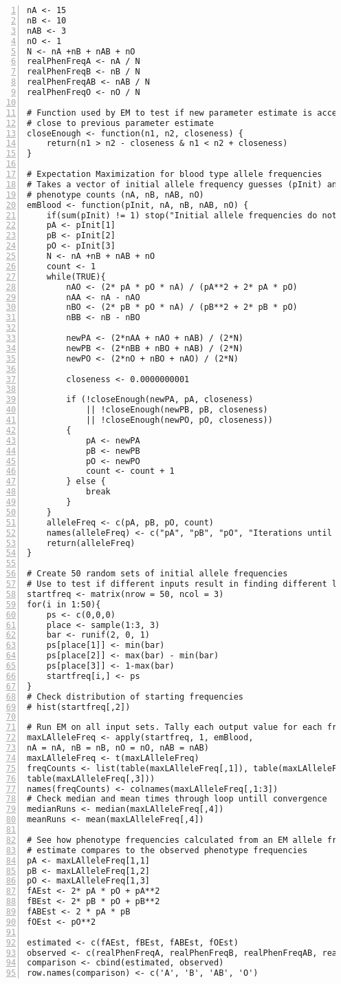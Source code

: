 \documentclass{article}
\begin{document}
		\begin{Verbatim}[numbers=left]
nA <- 15
nB <- 10
nAB <- 3
nO <- 1 
N <- nA +nB + nAB + nO
realPhenFreqA <- nA / N 
realPhenFreqB <- nB / N
realPhenFreqAB <- nAB / N
realPhenFreqO <- nO / N

# Function used by EM to test if new parameter estimate is acceptibly 
# close to previous parameter estimate
closeEnough <- function(n1, n2, closeness) {
	return(n1 > n2 - closeness & n1 < n2 + closeness)
}

# Expectation Maximization for blood type allele frequencies
# Takes a vector of initial allele frequency guesses (pInit) and observed
# phenotype counts (nA, nB, nAB, nO)
emBlood <- function(pInit, nA, nB, nAB, nO) {
	if(sum(pInit) != 1) stop("Initial allele frequencies do not sum to 1")
	pA <- pInit[1]
	pB <- pInit[2]
	pO <- pInit[3]
	N <- nA +nB + nAB + nO
	count <- 1
	while(TRUE){
		nAO <- (2* pA * pO * nA) / (pA**2 + 2* pA * pO)
		nAA <- nA - nAO
		nBO <- (2* pB * pO * nA) / (pB**2 + 2* pB * pO)
		nBB <- nB - nBO
		
		newPA <- (2*nAA + nAO + nAB) / (2*N)
		newPB <- (2*nBB + nBO + nAB) / (2*N)
		newPO <- (2*nO + nBO + nAO) / (2*N)
		
		closeness <- 0.0000000001
		
		if (!closeEnough(newPA, pA, closeness) 	
			|| !closeEnough(newPB, pB, closeness) 
			|| !closeEnough(newPO, pO, closeness)) 
		{
			pA <- newPA
			pB <- newPB
			pO <- newPO
			count <- count + 1
		} else {
			break
		}
	}
	alleleFreq <- c(pA, pB, pO, count)
	names(alleleFreq) <- c("pA", "pB", "pO", "Iterations until Convergence")
	return(alleleFreq)
}

# Create 50 random sets of initial allele frequencies
# Use to test if different inputs result in finding different local maxima
startfreq <- matrix(nrow = 50, ncol = 3)
for(i in 1:50){
	ps <- c(0,0,0)
	place <- sample(1:3, 3)
	bar <- runif(2, 0, 1)
	ps[place[1]] <- min(bar)
	ps[place[2]] <- max(bar) - min(bar)
	ps[place[3]] <- 1-max(bar)
	startfreq[i,] <- ps
}
# Check distribution of starting frequencies
# hist(startfreq[,2]) 

# Run EM on all input sets. Tally each output value for each frequency
maxLAlleleFreq <- apply(startfreq, 1, emBlood, 
nA = nA, nB = nB, nO = nO, nAB = nAB)
maxLAlleleFreq <- t(maxLAlleleFreq)
freqCounts <- list(table(maxLAlleleFreq[,1]), table(maxLAlleleFreq[,2]), 
table(maxLAlleleFreq[,3]))
names(freqCounts) <- colnames(maxLAlleleFreq[,1:3])
# Check median and mean times through loop untill convergence
medianRuns <- median(maxLAlleleFreq[,4])
meanRuns <- mean(maxLAlleleFreq[,4])

# See how phenotype frequencies calculated from an EM allele frequency
# estimate compares to the observed phenotype frequencies
pA <- maxLAlleleFreq[1,1]
pB <- maxLAlleleFreq[1,2]
pO <- maxLAlleleFreq[1,3]
fAEst <- 2* pA * pO + pA**2
fBEst <- 2* pB * pO + pB**2
fABEst <- 2 * pA * pB
fOEst <- pO**2

estimated <- c(fAEst, fBEst, fABEst, fOEst)
observed <- c(realPhenFreqA, realPhenFreqB, realPhenFreqAB, realPhenFreqO)
comparison <- cbind(estimated, observed)
row.names(comparison) <- c('A', 'B', 'AB', 'O')
		\end{Verbatim}
	
\end{document}
